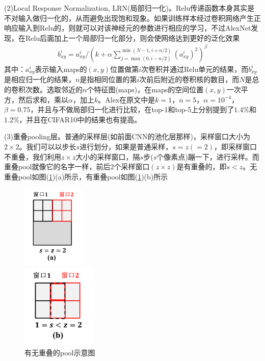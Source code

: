         \par
        (2)Local Response Normalization, LRN(局部归一化)。Relu传递函数本身其实是不对输入做归一化的，从而避免出现饱和现象。如果训练样本经过卷积网络产生正响应输入到Relu的，则就可以对该神经元的参数进行相应的学习，不过AlexNet发现，在Relu后面加上一个局部归一化部分，则会使网络达到更好的泛化效果
        \begin{align*}
        b_{xy}^i = a_{xy}^i\Bigg/ \left( k+\alpha\sum_{j=\max(0,i-n/2)}^{\min (N-1,i+n/2)} (a_{xy}^i)^2\right)^\beta
        \end{align*}
        其中：$a_{xy}^i$表示输入maps的$(x,y)$位置做第$i$次卷积并通过Relu单元的结果，而$b_{xy}^i$是相应归一化的结果，$n$是指相同位置的第$i$次前后附近的卷积核的数目，而$N$是总的卷积次数。选取邻近的$n$个特征图(maps)，在maps的空间位置$(x,y)$一次平方，然后求和，乘以$\alpha$，加上$k$。Alex在原文中是$k=1$，$n=5$，$\alpha=10^{-4}$，$\beta = 0.75$，并且与不做局部归一化进行比较，在top-1和top-5上分别提到了$1.4\%$和$1.2\%$，并且在CIFAR10中的结果也有提高。
        \par
        (3)重叠pooling层。普通的采样层(如前面CNN的池化层那样)，采样窗口大小为$2\times 2$。我们可以以步长$s$进行划分，如果是普通采样，$s=z(=2)$，即采样窗口不重叠，我们利用$z\times z$大小的采样窗口，隔$s$步($s$个像素点)蹦一下，进行采样。而重叠pool就像它的名字一样，前后2个采样窗口$(z\times z)$是有重叠的，即$s<z$。无重叠pool如图(\ref{fig:有无重叠的pool示意图})(a)所示，有重叠pool如图(\ref{fig:有无重叠的pool示意图})(b)所示
            \begin{figure}[H]
              \centering
              \begin{varwidth}[t]{\textwidth}
                \vspace{0pt}
                \includegraphics[height=4cm]{images/yes_or_no_overlapping_pool1.jpg}
              \end{varwidth}
              \qquad\qquad
              \begin{varwidth}[t]{\textwidth}
                \vspace{0pt}
                \includegraphics[height=4cm]{images/yes_or_no_overlapping_pool2.jpg}
              \end{varwidth}
                \caption{有无重叠的pool示意图}
                \label{fig:有无重叠的pool示意图}
            \end{figure}
